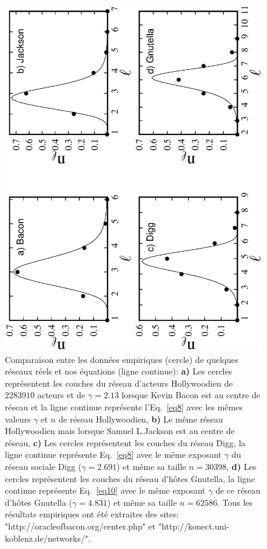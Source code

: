 \begin{figure}[h!]
	\centering
	\includegraphics[scale=0.6,angle=-90]{./figures/couch-reel}
	\caption{Comparaison entre les données empiriques (cercle) de quelques réseaux réels et nos équations (ligne continue): \textbf{a)} Les cercles représentent les couches du réseau d’acteurs Hollywoodien de $2283910$ acteurs et de $\gamma=2.13$ lorsque Kevin Bacon est au centre de réseau et la ligne continue représente l'Eq.~\ref{eq8} avec les mêmes valeurs $\gamma$ et $n$ de réseau Hollywoodien, \textbf{b)} Le même réseau Hollywoodien mais lorsque Samuel L.Jackson est au centre de réseau, \textbf{c)} Les cercles représentent les couches du réseau Digg, la ligne continue représente Eq.~\ref{eq8} avec le même exposant $\gamma$ du réseau sociale Digg ($\gamma=2.691$) et même sa taille $n=30398$, \textbf{d)} Les cercles représentent les couches du réseau d’h{\^o}tes Gnutella, la ligne continue représente Eq.~\ref{eq10} avec le même exposant $\gamma$ de ce réseau d’hôtes Gnutella ($\gamma=4.831$) et même sa taille $n=62586$. Tous les résultats empiriques ont été extraites des sites: "http://oracleofbacon.org/center.php" et "http://konect.uni-koblenz.de/networks/".}	
	\label{couch-reel}
\end{figure}
    
